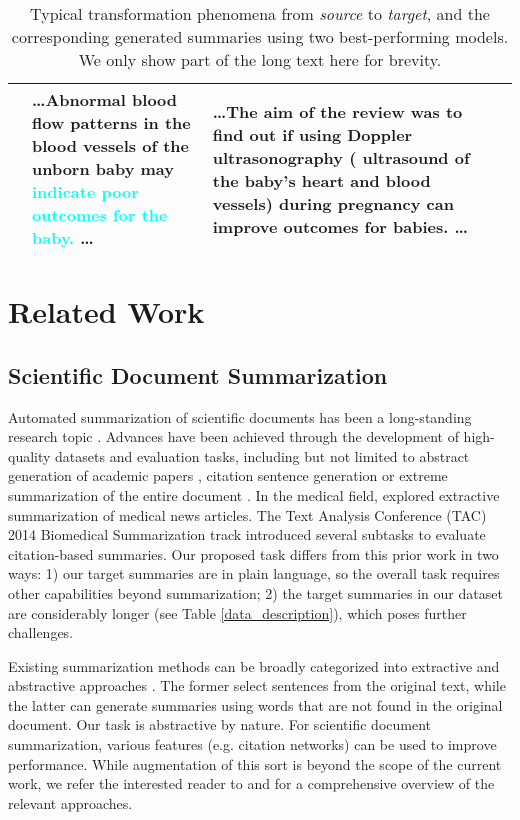 \documentclass[letterpaper, table]{article}
\begin{document}
\begin{table*}[t!]
\begin{tabular}{@{}m{1.4cm}<{\centering}m{3.55cm}<{\centering}m{3.55cm}<{\centering}m{3.55cm}<{\centering}m{3.55cm}<{\centering} @{}}
& \ldots Abnormal blood flow patterns in the blood vessels of the unborn baby may \textcolor{cyan}{indicate poor outcomes for the baby.}  \ldots
& \ldots The aim of the review was to find out if using Doppler ultrasonography ( ultrasound of the baby's heart and blood vessels) during pregnancy can improve outcomes for babies. \ldots \\
\bottomrule
\end{tabular}
\caption{Typical transformation phenomena from \textit{source} to \textit{target}, and the corresponding generated summaries using two best-performing models. We only show part of the long text here for brevity.}
\label{transformation_case_study}

\end{table*}











\section{Related Work}
\subsection{Scientific Document Summarization}
Automated summarization of scientific documents has been a long-standing research topic \cite{Paice1980TheAG,teufel2002summarization}. Advances have been achieved through the development of high-quality datasets and evaluation tasks, including but not limited to abstract generation of academic papers \cite{Cohan2018ADA}, citation sentence generation \cite{Luu2020CitationTG} or extreme
summarization of the entire document \cite{Cachola2020TLDRES}. In the medical field, \citet{Sarkar2011UsingML} explored extractive summarization of medical news articles.
The Text Analysis Conference (TAC) 2014 Biomedical Summarization track introduced several subtasks to evaluate citation-based summaries.
Our proposed task differs from this prior work in two ways: 1) our target summaries are in plain language, so the overall task requires other capabilities beyond summarization;
2) the target summaries in our dataset are considerably longer (see Table \ref{data_description}), which poses further challenges.

Existing summarization methods can be broadly categorized into extractive and abstractive approaches \cite{Andr2007ASO}. The former \cite{Erkan2004LexRankGC, Cheng2016NeuralSB} select sentences from the original text, while the latter \cite{rush2015abstractive, nallapati2016abstractive} can generate summaries using words that are not found in the original document. Our task is abstractive by nature. For scientific document summarization, various features (e.g. citation networks) can be used to improve performance. While augmentation of this sort is beyond the scope of the current work, we refer the interested reader to \citet{Altmami2020AutomaticSO} and \citet{ Moradi2019TextSI} for a  comprehensive overview of the relevant approaches.
\end{document}
